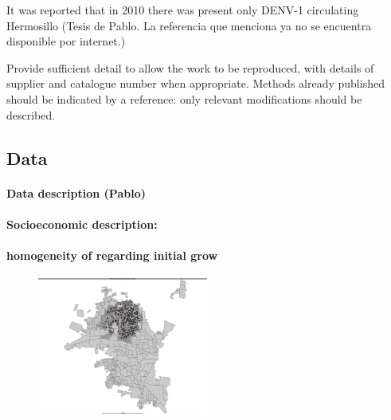 It was reported that in 2010 there was present only DENV-1 circulating
Hermosillo (Tesis de Pablo. La referencia que menciona ya no se encuentra
disponible por internet.)

Provide sufficient detail to allow the work to be
reproduced, with details of supplier and catalogue
number when appropriate. Methods already published
should be indicated by a reference: only relevant
modifications should be described.
\subsection{Data}
    \paragraph{Data description (Pablo)}
    \paragraph{Socioeconomic description:}
    \paragraph{homogeneity of regarding initial grow}
	\begin{figure}[htb]
		\centering
		\includegraphics[width=0.5\textwidth, keepaspectratio]{maped_cases.png}
	\end{figure}